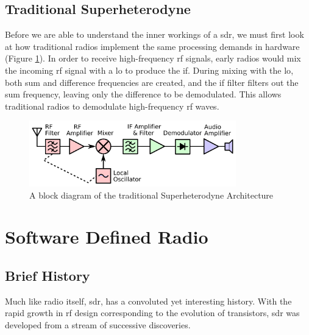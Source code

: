 \documentclass[class=report,11pt,crop=false]{standalone}
\begin{document}
\subsection{Traditional Superheterodyne}
Before we are able to understand the inner workings of a \gls{sdr}, we must first look at how traditional radios implement the same processing demands in hardware (Figure \ref{fig:traditonal-superhet}). In order to receive high-frequency \gls{rf} signals, early radios would mix the incoming \gls{rf} signal with a \gls{lo} to produce the \gls{if}. During mixing with the \gls{lo}, both sum and difference frequencies are created, and the \gls{if} filter filters out the sum frequency, leaving only the difference to be demodulated. This allows traditional radios to demodulate high-frequency \gls{rf} waves. 

\begin{figure}[h]
    \centering
    \includegraphics[width=0.8\textwidth]{Images/diagrams/Superheterodyne_receiver_block_diagram.png}
    \caption{A block diagram of the traditional Superheterodyne Architecture \cite{superhet}}
    \label{fig:traditonal-superhet}
\end{figure}
\section{Software Defined Radio}

\subsection{Brief History}
Much like radio itself, \gls{sdr}, has a convoluted yet interesting history. With the rapid growth in \gls{rf} design corresponding to the evolution of transistors, \gls{sdr} was developed from a stream of successive discoveries.
\end{document}
